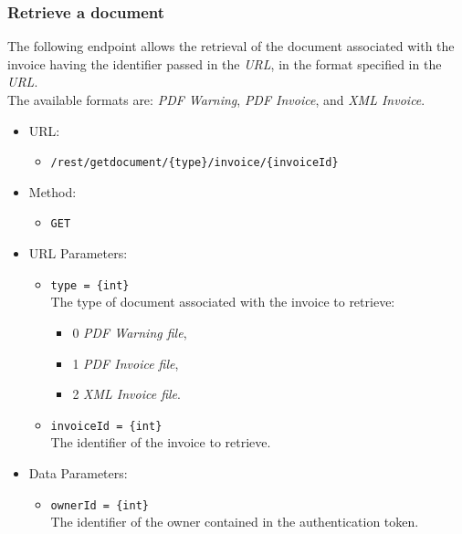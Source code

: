 \begin{itemize}
\end{itemize}


\newpage
\subsubsection*{Retrieve a document}

The following endpoint allows the retrieval of the document associated with the invoice having the identifier passed in the \textit{URL}, in the format specified in the \textit{URL}. \\
The available formats are: \textit{PDF Warning}, \textit{PDF Invoice}, and \textit{XML Invoice}.

\begin{itemize}
    
    \item URL: 
    \begin{itemize}
        \item \texttt{/rest/getdocument/\{type\}/invoice/\{invoiceId\}}
    \end{itemize}
    
    \item Method: 
    \begin{itemize}
        \item \texttt{GET}
    \end{itemize}
    
    \item URL Parameters: 
    \begin{itemize}
        \item \texttt{type = \{int\}} \\
        The type of document associated with the invoice to retrieve:
        \begin{itemize}
            \item 0 \textrightarrow \textit{PDF Warning file},
            \item 1 \textrightarrow \textit{PDF Invoice file},
            \item 2 \textrightarrow \textit{XML Invoice file}.
        \end{itemize}
        \item \texttt{invoiceId = \{int\}} \\
        The identifier of the invoice to retrieve.
    \end{itemize}
    
    \item Data Parameters: 
    \begin{itemize}
        \item \texttt{ownerId = \{int\}} \\
        The identifier of the owner contained in the authentication token.
    \end{itemize}
    

\end{itemize}

